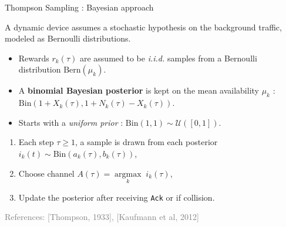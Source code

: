 \documentclass[12pt,english,ignorenonframetext,aspectratio=169,]{beamer}
\providecommand{\tightlist}{%
  \setlength{\itemsep}{0pt}\setlength{\parskip}{0pt}}
\begin{document}
\begin{frame}[noframenumbering]{Thompson Sampling : Bayesian approach}

A dynamic device assumes a stochastic hypothesis on the background
traffic, modeled as Bernoulli distributions.

\begin{itemize}
\item
  Rewards \(r_k(\tau)\) are assumed to be \emph{i.i.d.} samples from a
  Bernoulli distribution \(\mathrm{Bern}(\mu_k)\).
\item
  A \textbf{binomial Bayesian posterior} is kept on the mean
  availability \(\mu_k\) :
  \(\mathrm{Bin}(1 + X_k(\tau), 1 + N_k(\tau) - X_k(\tau))\).
\item
  Starts with a \emph{uniform prior} :
  \(\mathrm{Bin}(1, 1) \sim \mathcal{U}([0,1])\).
\end{itemize}

\begin{enumerate}
\def\labelenumi{\arabic{enumi}.}
\tightlist
\setlength{\itemindent}{1em}  %
\item
  Each step \(\tau \geq 1\), a sample is drawn from each posterior
  \(i_k(t) \sim \mathrm{Bin}(a_k(\tau), b_k(\tau))\),
\item
  Choose channel \(A(\tau) = \mathop{\arg\max}\limits_k \; i_k(\tau)\),
\item
  Update the posterior after receiving \texttt{Ack} or if collision.
\end{enumerate}

\vfill{}\hfill{}\tiny{\textcolor{gray}{References: [Thompson, 1933], [Kaufmann et al, 2012]}}

\end{frame}

\backupend
\end{document}
